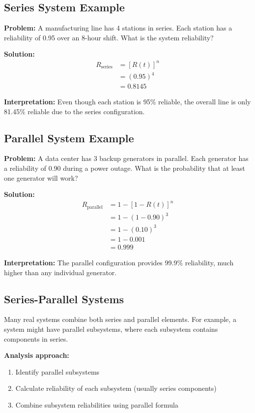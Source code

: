 \documentclass[twoside]{book}
\begin{document}
\subsection{Series System Example}

\textbf{Problem:} A manufacturing line has 4 stations in series. Each station has a reliability of 0.95 over an 8-hour shift. What is the system reliability?

\textbf{Solution:}
\begin{align}
R_{\text{series}} &= [R(t)]^n \\
&= (0.95)^4 \\
&= 0.8145
\end{align}

\textbf{Interpretation:} Even though each station is 95\% reliable, the overall line is only 81.45\% reliable due to the series configuration.

\subsection{Parallel System Example}

\textbf{Problem:} A data center has 3 backup generators in parallel. Each generator has a reliability of 0.90 during a power outage. What is the probability that at least one generator will work?

\textbf{Solution:}
\begin{align}
R_{\text{parallel}} &= 1 - [1 - R(t)]^n \\
&= 1 - (1 - 0.90)^3 \\
&= 1 - (0.10)^3 \\
&= 1 - 0.001 \\
&= 0.999
\end{align}

\textbf{Interpretation:} The parallel configuration provides 99.9\% reliability, much higher than any individual generator.

\subsection{Series-Parallel Systems}

Many real systems combine both series and parallel elements. For example, a system might have parallel subsystems, where each subsystem contains components in series.

\textbf{Analysis approach:}
\begin{enumerate}
    \item Identify parallel subsystems
    \item Calculate reliability of each subsystem (usually series components)
    \item Combine subsystem reliabilities using parallel formula
\end{enumerate}
\end{document}
